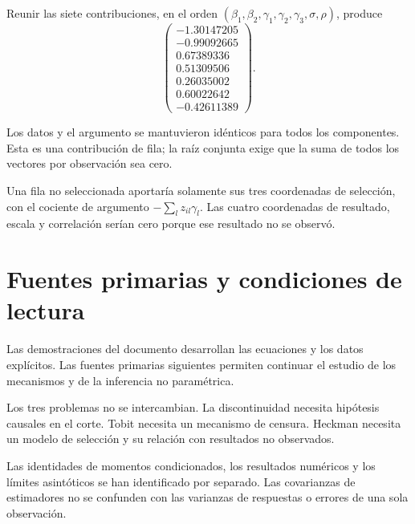 \documentclass[11pt,a4paper]{article}
\begin{document}
\begin{ejemplo}
Reunir las siete contribuciones, en el orden
\((\beta_1,\beta_2,\gamma_1,\gamma_2,\gamma_3,\sigma,\rho)\),
produce
\[
\begin{pmatrix}-1.30147205\\-0.99092665\\0.67389336\\0.51309506\\0.26035002\\0.60022642\\-0.42611389\end{pmatrix}.
\]

Los datos y el argumento se mantuvieron idénticos para
todos los componentes. Esta es una contribución de fila;
la raíz conjunta exige que la suma de todos los vectores
por observación sea cero.

Una fila no seleccionada aportaría solamente
sus tres coordenadas de selección, con el cociente
de argumento \(-\sum_lz_{il}\gamma_l\).
Las cuatro coordenadas de resultado, escala y correlación
serían cero porque ese resultado no se observó.
\end{ejemplo}

\clearpage
{}
\section{Fuentes primarias y condiciones de lectura}\label{unidad179}
Las demostraciones del documento desarrollan
las ecuaciones y los datos explícitos.
Las fuentes primarias siguientes permiten
continuar el estudio de los mecanismos
y de la inferencia no paramétrica.

Los tres problemas no se intercambian.
La discontinuidad necesita hipótesis causales
en el corte. Tobit necesita un
mecanismo de censura. Heckman necesita
un modelo de selección y su
relación con resultados no observados.

Las identidades de momentos condicionados,
los resultados numéricos y los
límites asintóticos se han identificado
por separado. Las covarianzas de
estimadores no se confunden con
las varianzas de respuestas o
errores de una sola observación.
\end{document}
